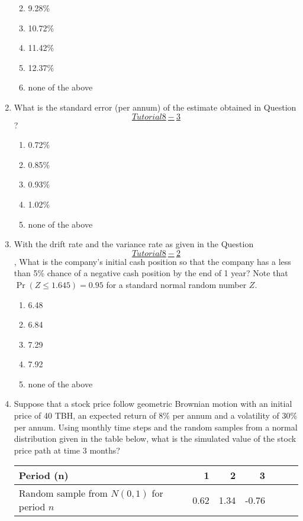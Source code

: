 \documentclass[
]{article}
\theoremstyle{definition}
\theoremstyle{definition}
\theoremstyle{definition}
\theoremstyle{definition}
\theoremstyle{remark}
\begin{document}
\begin{enumerate}
  \begin{enumerate}
  \def\labelenumii{\Alph{enumii}.}
  \item
    9.28\%
  \item
    10.72\%
  \item
    11.42\%
  \item
    12.37\%
  \item
    none of the above
  \end{enumerate}
\item
  What is the standard error (per annum) of the estimate obtained in
  Question \protect\hyperlink{Tutorial8-3}{\[Tutorial8-3\]}?

  \begin{enumerate}
  \def\labelenumii{\Alph{enumii}.}
  \item
    0.72\%
  \item
    0.85\%
  \item
    0.93\%
  \item
    1.02\%
  \item
    none of the above
  \end{enumerate}
\item
  With the drift rate and the variance rate as given in the Question
  \protect\hyperlink{Tutorial8-2}{\[Tutorial8-2\]}, What is the
  company's initial cash position so that the company has a less than
  5\% chance of a negative cash position by the end of 1 year? Note
  that \(\Pr( Z \le 1.645) = 0.95\) for a standard normal random number
  \(Z\).

  \begin{enumerate}
  \def\labelenumii{\Alph{enumii}.}
  \item
    6.48
  \item
    6.84
  \item
    7.29
  \item
    7.92
  \item
    none of the above
  \end{enumerate}
\item
  Suppose that a stock price follow geometric Brownian motion with an
  initial price of 40 TBH, an expected return of 8\% per annum and a
  volatility of 30\% per annum. Using monthly time steps and the random
  samples from a normal distribution given in the table below, what is
  the simulated value of the stock price path at time 3 months?

  \begin{longtable}[]{@{}lrrrlll@{}}
  \toprule
  Period (n) & 1 & 2 & 3 & & & \\
  \midrule
  \endhead
  Random sample from \(N(0,1)\) for period \(n\) & 0.62 & 1.34 & -0.76 & & & \\
  \bottomrule
  \end{longtable}


\end{enumerate}
\end{document}
